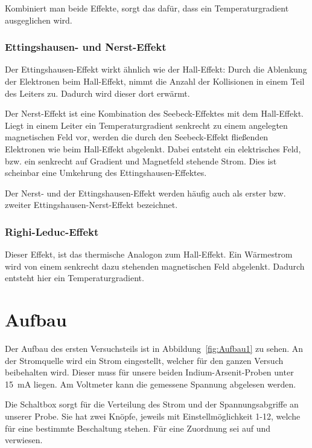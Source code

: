 Kombiniert man beide Effekte, sorgt das dafür, dass ein Temperaturgradient
ausgeglichen wird.

\subsection{Ettingshausen- und Nerst-Effekt}

Der Ettingshausen-Effekt wirkt ähnlich wie der Hall-Effekt: Durch die
Ablenkung der Elektronen beim Hall-Effekt, nimmt die Anzahl der Kollisionen in
einem Teil des Leiters zu. Dadurch wird dieser dort erwärmt.

Der Nerst-Effekt ist eine Kombination des Seebeck-Effektes mit dem Hall-Effekt.
Liegt in einem Leiter ein Temperaturgradient senkrecht zu einem angelegten
magnetischen Feld vor, werden die durch den Seebeck-Effekt fließenden
Elektronen wie beim Hall-Effekt abgelenkt. Dabei entsteht ein elektrisches
Feld, bzw. ein senkrecht auf Gradient und Magnetfeld stehende Strom. Dies ist
scheinbar eine Umkehrung des Ettingshausen-Effektes.

Der Nerst- und der Ettingshausen-Effekt werden häufig auch als erster bzw.
zweiter Ettingshausen-Nerst-Effekt bezeichnet.

\subsection{Righi-Leduc-Effekt}

Dieser Effekt, ist das thermische Analogon zum Hall-Effekt. Ein Wärmestrom wird
von einem senkrecht dazu stehenden magnetischen Feld abgelenkt. Dadurch
entsteht hier ein Temperaturgradient.

\FloatBarrier
\chapter{Aufbau}

Der Aufbau des ersten Versuchsteils ist in Abbildung~\ref{fig:Aufbau1} zu
sehen. An der Stromquelle wird ein Strom eingestellt, welcher für den ganzen
Versuch beibehalten wird. Dieser muss für unsere beiden Indium-Arsenit-Proben
unter \SI{15}{\milli\ampere} liegen. Am Voltmeter kann die gemessene Spannung
abgelesen werden.

Die Schaltbox sorgt für die Verteilung des Strom und der Spannungsabgriffe an
unserer Probe. Sie hat zwei Knöpfe, jeweils mit Einstellmöglichkeit 1-12,
welche für eine bestimmte Beschaltung stehen. Für eine Zuordnung sei auf
\cite[Tab.~4.1]{heldt/Diplomarbeit} und \cite[Tab.~4.2]{heldt/Diplomarbeit}
verwiesen.

